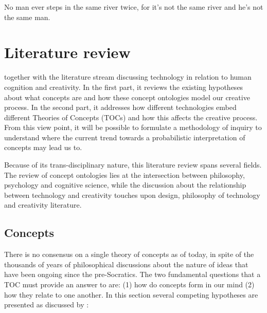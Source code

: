 \begin{savequote}[75mm]
No man ever steps in the same river twice,
for it's not the same river and he's not the same man.

\end{savequote}

\chapter{Literature review}
\label{Litreview}


 together with the literature stream discussing technology in relation to human cognition and creativity. In the first part, it reviews the existing hypotheses about what concepts are and how these concept ontologies model our creative process. In the second part, it addresses how different technologies embed different Theories of Concepts (TOCs) and how this affects the creative process. From this view point, it will be possible to formulate a methodology of inquiry to understand where the current trend towards a probabilistic interpretation of concepts may lead us to.

Because of its trans-disciplinary nature, this literature review spans several fields. The review of concept ontologies lies at the intersection between philosophy, psychology and cognitive science, while the discussion about the relationship between technology and creativity touches upon design, philosophy of technology and creativity literature.

\section{Concepts}\label{sec:concepts}
There is no consensus on a single theory of concepts as of today, in spite of the thousands of years of philosophical discussions about the nature of ideas that have been ongoing since the pre-Socratics. The two fundamental questions that a TOC must provide an answer to are: (1) how do concepts form in our mind (2) how they relate to one another. In this section several competing hypotheses are presented as discussed by \cite{Laurence1999}:

